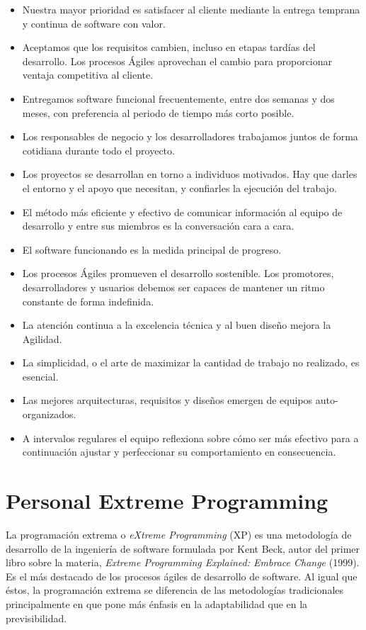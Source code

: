 \begin{itemize}
	\itemsep1pt \parskip1pt 
	\item Nuestra mayor prioridad es satisfacer al cliente mediante la entrega temprana y continua de software con valor.
	\item Aceptamos que los requisitos cambien, incluso en etapas tardías del desarrollo. Los procesos Ágiles aprovechan el cambio para proporcionar ventaja competitiva al	cliente.
	\item Entregamos software funcional frecuentemente, entre dos semanas y dos meses, con preferencia al periodo de tiempo más corto posible.
	\item Los responsables de negocio y los desarrolladores	trabajamos juntos de forma cotidiana durante todo el proyecto.
	\item Los proyectos se desarrollan en torno a individuos motivados. Hay que darles el entorno y el apoyo que necesitan, y confiarles la ejecución del trabajo.
	\item El método más eficiente y efectivo de comunicar información al equipo de desarrollo y entre sus miembros es la conversación cara a cara.
	\item El software funcionando es la medida principal de	progreso.
	\item Los procesos Ágiles promueven el desarrollo sostenible. Los promotores, desarrolladores y usuarios
	debemos ser capaces de mantener un ritmo constante de forma indefinida.
	\item La atención continua a la excelencia técnica y al	buen diseño mejora la Agilidad.
	\item La simplicidad, o el arte de maximizar la cantidad de	trabajo no realizado, es esencial.
	\item Las mejores arquitecturas, requisitos y diseños emergen de equipos auto-organizados.
	\item A intervalos regulares el equipo reflexiona sobre	cómo ser más efectivo para a continuación ajustar y perfeccionar su comportamiento en consecuencia.
\end{itemize}

\section{Personal Extreme Programming}
La programación extrema o \textit{eXtreme Programming} (XP) es una metodología de desarrollo de la ingeniería de software formulada por Kent Beck, autor del primer libro sobre la materia, \textit{Extreme Programming Explained: Embrace Change} (1999). Es el más destacado de los procesos ágiles de desarrollo de software. Al igual que éstos, la programación extrema se diferencia de las metodologías tradicionales principalmente en que pone más énfasis en la adaptabilidad que en la previsibilidad.

